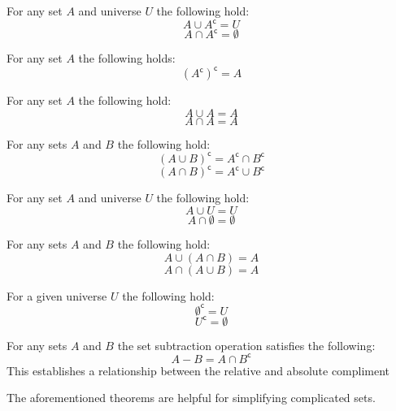 \documentclass[main.tex]{subfiles}
\begin{document}
\begin{thm}[Inverse]
	For any set \(A\) and universe \(U\) the following hold: \[A \cup A^{\mathsf{c}} = U\] \[A \cap A^{\mathsf{c}} = \emptyset\]
\end{thm}

\begin{thm}
	For any set \(A\) the following holds: \[(A^{\mathsf{c}})^{\mathsf{c}} = A\]
\end{thm}

\begin{thm}[Idempotence]
	For any set \(A\) the following hold: \[A \cup A = A\] \[A \cap A = A\]
\end{thm}

\begin{thm}[De Morgan's]
	For any sets \(A\) and \(B\) the following hold: \[(A \cup B)^{\mathsf{c}} = A^{\mathsf{c}} \cap B^{\mathsf{c}}\] \[(A \cap B)^{\mathsf{c}} = A^{\mathsf{c}} \cup B^{\mathsf{c}}\]
\end{thm}

\begin{thm}
	For any set \(A\) and universe \(U\) the following hold: \[A \cup U = U\] \[A \cap \emptyset = \emptyset\]
\end{thm}

\begin{thm}[Absorption]
	For any sets \(A\) and \(B\) the following hold: \[A \cup (A \cap B) = A\] \[A \cap (A \cup B) = A\]
\end{thm}

\begin{thm}
	For a given universe \(U\) the following hold: \[\emptyset^{\mathsf{c}} = U\] \[U^{\mathsf{c}} = \emptyset\]
\end{thm}

\begin{thm}
	\label{set-sub-eq}
	For any sets \(A\) and \(B\) the set subtraction operation satisfies the following: \[A - B = A \cap B^{\mathsf{c}}\]
	This establishes a relationship between the relative and absolute compliment
\end{thm}

The aforementioned theorems are helpful for simplifying complicated sets.

\end{document}
